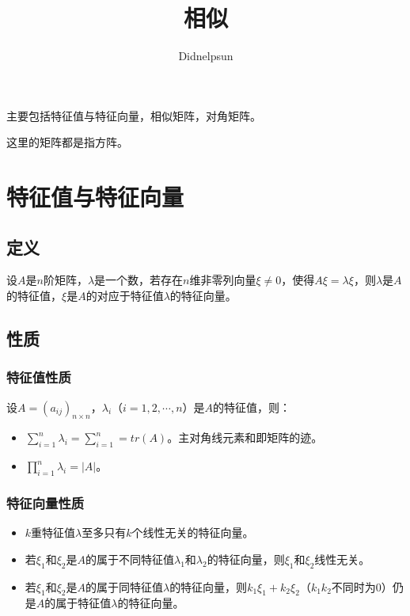 \documentclass[UTF8, 12pt]{ctexart}
\author{Didnelpsun}
\title{相似}
\date{}
\begin{document}
\maketitle
\pagestyle{empty}
\thispagestyle{empty}
\tableofcontents
\thispagestyle{empty}
\newpage
\pagestyle{plain}
\setcounter{page}{1}

主要包括特征值与特征向量，相似矩阵，对角矩阵。

这里的矩阵都是指方阵。

\section{特征值与特征向量}

\subsection{定义}

设$A$是$n$阶矩阵，$\lambda$是一个数，若存在$n$维非零列向量$\xi\neq0$，使得$A\xi=\lambda\xi$，则$\lambda$是$A$的特征值，$\xi$是$A$的对应于特征值$\lambda$的特征向量。

\subsection{性质}

\subsubsection{特征值性质}

设$A=(a_{ij})_{n\times n}$，$\lambda_i$（$i=1,2,\cdots,n$）是$A$的特征值，则：

\begin{itemize}
    \item $\sum\limits_{i=1}^n\lambda_i=\sum\limits_{i=1}^n=tr(A)$。主对角线元素和即矩阵的迹。
    \item $\prod\limits_{i=1}^n\lambda_i=\vert A\vert$。
\end{itemize}

\subsubsection{特征向量性质}

\begin{itemize}
    \item $k$重特征值$\lambda$至多只有$k$个线性无关的特征向量。
    \item 若$\xi_1$和$\xi_2$是$A$的属于不同特征值$\lambda_1$和$\lambda_2$的特征向量，则$\xi_1$和$\xi_2$线性无关。
    \item 若$\xi_1$和$\xi_2$是$A$的属于同特征值$\lambda$的特征向量，则$k_1\xi_1+k_2\xi_2$（$k_1k_2$不同时为0）仍是$A$的属于特征值$\lambda$的特征向量。
\end{itemize}
\end{document}
